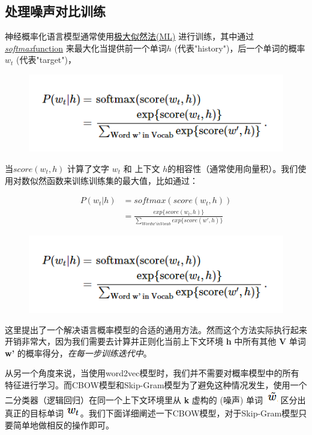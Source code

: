 \subsection{处理噪声对比训练}\label{ux5904ux7406ux566aux58f0ux5bf9ux6bd4ux8badux7ec3}

神经概率化语言模型通常使用\href{https://en.wikipedia.org/wiki/Maximum_likelihood}{极大似然法(ML)} 进行训练，其中通过\href{https://en.wikipedia.org/wiki/Softmax_function}{\emph{softmax}function} 来最大化当提供前一个单词$h$ (代表"history")，后一个单词的概率$w_t$ (代表"target")，

\begin{figure}[htbp]
\centering
\includegraphics{../SOURCE/images/vr2.png}
\caption{}
\end{figure}

当$score(w_t,h)$ 计算了文字 $w_t$ 和 上下文 $h$的相容性（通常使用向量积）。我们使用对数似然函数来训练训练集的最大值，比如通过：

\begin{align}
P(w_t|h) & = softmax(score(w_t,h)) \\
         & = \frac{exp\{score(w_t,h)\}}{\sum_{Word w'in Vocab}{exp\{score(w',h)\}}}
\end{align}

\begin{figure}[htbp]
\centering
\includegraphics{../SOURCE/images/vr2.png}
\caption{}
\end{figure}

这里提出了一个解决语言概率模型的合适的通用方法。然而这个方法实际执行起来开销非常大，因为我们需要去计算并正则化当前上下文环境
\textbf{h} 中所有其他 \textbf{V} 单词 \textbf{w'}
的概率得分，\emph{在每一步训练迭代中}。

从另一个角度来说，当使用word2vec模型时，我们并不需要对概率模型中的所有特征进行学习。而CBOW模型和Skip-Gram模型为了避免这种情况发生，使用一个二分类器（逻辑回归）在同一个上下文环境里从
\textbf{k} 虚构的 (噪声) 单词 \includegraphics{../SOURCE/images/rw5.png}
区分出真正的目标单词
\includegraphics{../SOURCE/images/rw4.png}。我们下面详细阐述一下CBOW模型，对于Skip-Gram模型只要简单地做相反的操作即可。

